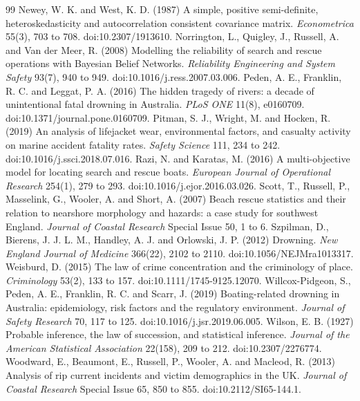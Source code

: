\documentclass[11pt,a4paper]{article}
\begin{document}
\begin{thebibliography}{99}
 Newey, W. K. and West, K. D. (1987) A simple, positive semi-definite, heteroskedasticity and autocorrelation consistent covariance matrix. \textit{Econometrica} 55(3), 703 to 708. doi:10.2307/1913610.
 Norrington, L., Quigley, J., Russell, A. and Van der Meer, R. (2008) Modelling the reliability of search and rescue operations with Bayesian Belief Networks. \textit{Reliability Engineering and System Safety} 93(7), 940 to 949. doi:10.1016/j.ress.2007.03.006.
 Peden, A. E., Franklin, R. C. and Leggat, P. A. (2016) The hidden tragedy of rivers: a decade of unintentional fatal drowning in Australia. \textit{PLoS ONE} 11(8), e0160709. doi:10.1371/journal.pone.0160709.
 Pitman, S. J., Wright, M. and Hocken, R. (2019) An analysis of lifejacket wear, environmental factors, and casualty activity on marine accident fatality rates. \textit{Safety Science} 111, 234 to 242. doi:10.1016/j.ssci.2018.07.016.
 Razi, N. and Karatas, M. (2016) A multi-objective model for locating search and rescue boats. \textit{European Journal of Operational Research} 254(1), 279 to 293. doi:10.1016/j.ejor.2016.03.026.
 Scott, T., Russell, P., Masselink, G., Wooler, A. and Short, A. (2007) Beach rescue statistics and their relation to nearshore morphology and hazards: a case study for southwest England. \textit{Journal of Coastal Research} Special Issue 50, 1 to 6.
 Szpilman, D., Bierens, J. J. L. M., Handley, A. J. and Orlowski, J. P. (2012) Drowning. \textit{New England Journal of Medicine} 366(22), 2102 to 2110. doi:10.1056/NEJMra1013317.
 Weisburd, D. (2015) The law of crime concentration and the criminology of place. \textit{Criminology} 53(2), 133 to 157. doi:10.1111/1745-9125.12070.
 Willcox-Pidgeon, S., Peden, A. E., Franklin, R. C. and Scarr, J. (2019) Boating-related drowning in Australia: epidemiology, risk factors and the regulatory environment. \textit{Journal of Safety Research} 70, 117 to 125. doi:10.1016/j.jsr.2019.06.005.
 Wilson, E. B. (1927) Probable inference, the law of succession, and statistical inference. \textit{Journal of the American Statistical Association} 22(158), 209 to 212. doi:10.2307/2276774.
 Woodward, E., Beaumont, E., Russell, P., Wooler, A. and Macleod, R. (2013) Analysis of rip current incidents and victim demographics in the UK. \textit{Journal of Coastal Research} Special Issue 65, 850 to 855. doi:10.2112/SI65-144.1.
\end{thebibliography}
\end{document}

